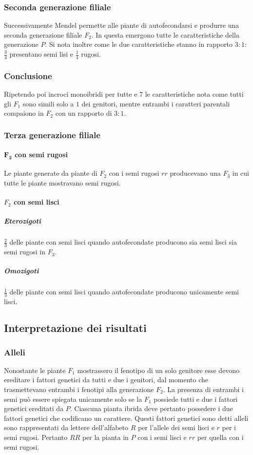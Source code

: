 \subsubsection{Seconda generazione filiale}
Successivamente Mendel permette alle piante di autofecondarsi e produrre una seconda generazione filiale $F_2$. In questa emergono tutte le caratteristiche della generazione $P$. Si nota inoltre come le 
due caratteristiche stanno in rapporto $3:1$: $\frac{3}{4}$ presentano semi lisi e $\frac{1}{4}$ rugosi. 
\subsubsection{Conclusione}
Ripetendo poi incroci monoibridi per tutte e $7$ le caratteristiche nota come tutti gli $F_1$ sono simili solo a $1$ dei genitori, mentre entrambi i caratteri parentali compaiono in $F_2$ con un rapporto 
di $3:1$.
\subsubsection{Terza generazione filiale}
\paragraph{$\mathbf{F_2}$ con semi rugosi}
Le piante generate da piante di $F_2$ con i semi rugosi $rr$ producevano una $F_3$ in cui tutte le piante mostravano semi rugosi. 
\paragraph{$F_2$ con semi lisci}
\subparagraph{Eterozigoti}
$\frac{2}{3}$ delle piante con semi lisci quando autofecondate producono sia semi lisci sia semi rugosi in $F_3$. 
\subparagraph{Omozigoti}
$\frac{1}{3}$ delle piante con semi lisci quando autofecondate producono unicamente semi lisci.
\subsection{Interpretazione dei risultati}
\subsubsection{Alleli}
Nonostante le piante $F_1$ mostrassero il fenotipo di un solo genitore esse devono ereditare i fattori genetici da tutti e due i genitori, dal momento che trasmettevano entrambi i fenotipi alla generazione
$F_2$. La presenza di entrambi i semi pu\`o essere spiegata unicamente solo se la $F_1$ possiede tutti e due i fattori genetici ereditati da $P$. Ciascuna pianta ibrida deve pertanto possedere i 
due fattori genetici che codificano un carattere. Questi fattori genetici sono detti alleli sono rappresentati da lettere dell'alfabeto $R$ per l'allele dei semi lisci e $r$ per i semi rugosi. Pertanto
$RR$ per la pianta in $P$ con i semi lisci e $rr$ per quella con i semi rugosi. 
